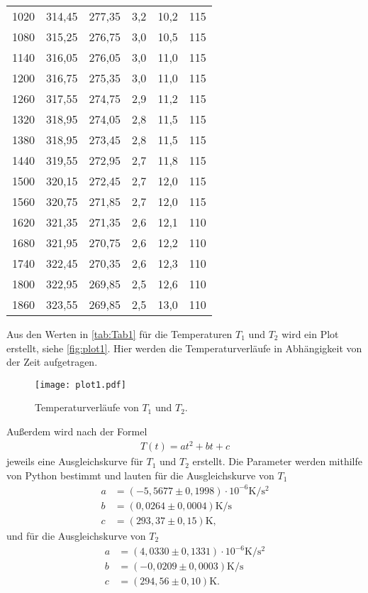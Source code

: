 \begin{table}[H]
\begin{tabular}{S[table-format=4.0] S S S[table-format=1.1] S[table-format=2.1] S[table-format=3.0]}
      1020 & 314,45 & 277,35 & 3,2 & 10,2 & 115\\
      1080 & 315,25 & 276,75 & 3,0 & 10,5 & 115\\
      1140 & 316,05 & 276,05 & 3,0 & 11,0 & 115\\
      1200 & 316,75 & 275,35 & 3,0 & 11,0 & 115\\
      1260 & 317,55 & 274,75 & 2,9 & 11,2 & 115\\
      1320 & 318,95 & 274,05 & 2,8 & 11,5 & 115\\
      1380 & 318,95 & 273,45 & 2,8 & 11,5 & 115\\
      1440 & 319,55 & 272,95 & 2,7 & 11,8 & 115\\
      1500 & 320,15 & 272,45 & 2,7 & 12,0 & 115\\
      1560 & 320,75 & 271,85 & 2,7 & 12,0 & 115\\
      1620 & 321,35 & 271,35 & 2,6 & 12,1 & 110\\
      1680 & 321,95 & 270,75 & 2,6 & 12,2 & 110\\
      1740 & 322,45 & 270,35 & 2,6 & 12,3 & 110\\
      1800 & 322,95 & 269,85 & 2,5 & 12,6 & 110\\
      1860 & 323,55 & 269,85 & 2,5 & 13,0 & 110\\
    \bottomrule
  \end{tabular}
\end{table}

Aus den Werten in \autoref{tab:Tab1} für die Temperaturen $T_1$ und $T_2$ wird ein Plot erstellt, siehe \autoref{fig:plot1}.
Hier werden die Temperaturverläufe in Abhängigkeit von der Zeit aufgetragen.

\begin{figure}
  \centering
  \texttt{[image: plot1.pdf]}
  \caption{Temperaturverläufe von $T_1$ und $T_2$.}
  \label{fig:plot1}
\end{figure}

Außerdem wird nach der Formel
\begin{align*}
  T(t)=at^2+bt+c
\end{align*}
jeweils eine Ausgleichskurve für $T_1$ und $T_2$ erstellt.
Die Parameter werden mithilfe von Python bestimmt und lauten für die Ausgleichskurve von $T_1$
\begin{align*}
  a&= (-5,5677 \pm 0,1998) \cdot 10^{-6} \si{\kelvin\per\second\squared}\\
  b&= (0,0264 \pm 0,0004) \si{\kelvin\per\second}\\
  c&= (293,37 \pm 0,15) \si{\kelvin},
\end{align*}
und für die Ausgleichskurve von $T_2$
\begin{align*}
  a&= (4,0330 \pm 0,1331) \cdot 10^{-6} \si{\kelvin\per\second\squared}\\
  b&= (-0,0209 \pm 0,0003) \si{\kelvin\per\second}\\
  c&= (294,56 \pm 0,10) \si{\kelvin}.
\end{align*}


